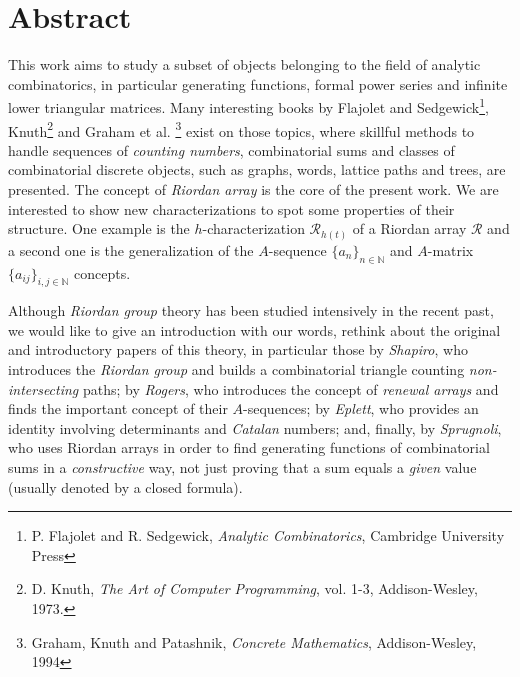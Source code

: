 \begingroup
\let\clearpage\relax
\let\cleardoublepage\relax
\let\cleardoublepage\relax

\vskip-2cm
\chapter*{Abstract}

\iftrue 
This work aims to study a subset of objects belonging to the field of analytic combinatorics,
in particular generating functions, formal power series
and infinite lower triangular matrices. Many interesting
books by Flajolet and Sedgewick\footnote{P. Flajolet and R.  Sedgewick,
\emph{Analytic Combinatorics}, Cambridge University Press}, Knuth\footnote{D.
Knuth, \emph{The Art of Computer Programming}, vol.  1-3, Addison-Wesley,
1973.} and Graham et al. \footnote{Graham, Knuth and Patashnik, \emph{Concrete
Mathematics}, Addison-Wesley, 1994} exist on those topics, where skillful
methods to handle sequences of \emph{counting numbers}, combinatorial sums and
classes of combinatorial discrete objects, such as graphs, words, lattice paths
and trees, are presented. The concept of \emph{Riordan array} is
the core of the present work.  We are interested to show new characterizations
to spot some properties of their structure. One example is the
$h$-characterization $\mathcal{R}_{h(t)}$ of a Riordan array $\mathcal{R}$ and
a second one is the generalization of the $A$-sequence $\lbrace
a_{n}\rbrace_{n\in\mathbb{N}}$ and $A$-matrix $\lbrace
a_{ij}\rbrace_{i,j\in\mathbb{N}}$ concepts.

Although \emph{Riordan group} theory has been studied intensively in the recent past, we would
like to give an introduction with our words, rethink about the original and
introductory papers of this theory, in particular those by \emph{Shapiro}, who
introduces the \emph{Riordan group} and builds a combinatorial triangle
counting \emph{non-intersecting} paths; by \emph{Rogers}, who introduces the
concept of \emph{renewal arrays} and finds the important concept of their
$A$-sequences; by \emph{Eplett}, who provides an identity involving
determinants and \emph{Catalan} numbers; and, finally, by \emph{Sprugnoli}, who
uses Riordan arrays in order to find generating functions of combinatorial sums
in a \emph{constructive} way, not just proving that a sum equals a \emph{given}
value (usually denoted by a closed formula). 

